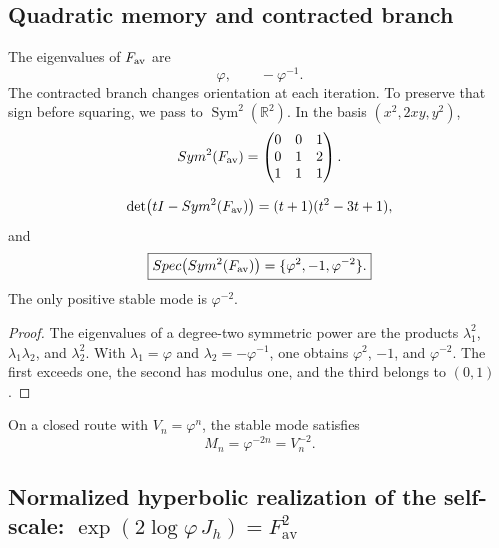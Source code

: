 \subsection{Quadratic memory and contracted branch}

The eigenvalues of \(F_{\rm av}\) are
\[
 \varphi,
 \qquad
 -\varphi^{-1}.
\]
The contracted branch changes orientation at each iteration. To preserve
that sign before squaring, we pass to
\(\operatorname{Sym}^2(\mathbb R^2)\). In the basis
\((x^2,2xy,y^2)\),
\begin{equation}
 \operatorname{Sym}^2(F_{\rm av})=
 \begin{pmatrix}
 0&0&1\\
 0&1&2\\
 1&1&1
 \end{pmatrix}.
 \label{p12-83-c9-s3:eq:sym2-Fav-phi}
\end{equation}

\begin{theorem}
\label{p12-83-c9-s3:thm:espectro-sym2-phi}
\[
 \det\bigl(tI-\operatorname{Sym}^2(F_{\rm av})\bigr)
 =(t+1)(t^2-3t+1),
\]
and
\begin{equation}
 \boxed{
 \operatorname{Spec}\bigl(\operatorname{Sym}^2(F_{\rm av})\bigr)
 =\{\varphi^2,-1,\varphi^{-2}\}.}
 \label{p12-83-c9-s3:eq:espectro-sym2-phi}
\end{equation}
The only positive stable mode is \(\varphi^{-2}\).
\end{theorem}

\begin{proof}
The eigenvalues of a degree-two symmetric power are the products
\(\lambda_1^2\), \(\lambda_1\lambda_2\), and \(\lambda_2^2\). With
\(\lambda_1=\varphi\) and \(\lambda_2=-\varphi^{-1}\), one obtains
\(\varphi^2\), \(-1\), and \(\varphi^{-2}\). The first exceeds one, the
second has modulus one, and the third belongs to \((0,1)\).
\end{proof}

On a closed route with \(V_n=\varphi^n\), the stable mode satisfies
\begin{equation}
 \boxed{M_n=\varphi^{-2n}=V_n^{-2}.}
 \label{p12-83-c9-s3:eq:modo-estable-phi}
\end{equation}

\subsection{Normalized hyperbolic realization of the self-scale: \(\exp(2\log\varphi\,J_h)=F_{\mathrm{av}}^2\)}

